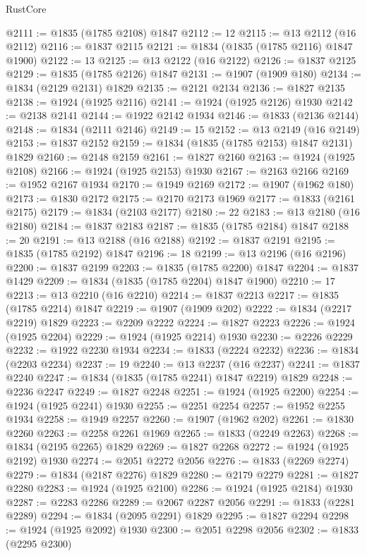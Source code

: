\begin{lexlean}{RustCore}
\begin{coremodule}
@2111 := @1835 (@1785 @2108) @1847
@2112 := 12
@2115 := @13 @2112 (@16 @2112)
@2116 := @1837 @2115
@2121 := @1834 (@1835 (@1785 @2116) @1847 @1900)
@2122 := 13
@2125 := @13 @2122 (@16 @2122)
@2126 := @1837 @2125
@2129 := @1835 (@1785 @2126) @1847
@2131 := @1907 (@1909 @180)
@2134 := @1834 (@2129 @2131) @1829
@2135 := @2121 @2134
@2136 := @1827 @2135
@2138 := @1924 (@1925 @2116)
@2141 := @1924 (@1925 @2126) @1930
@2142 := @2138 @2141
@2144 := @1922 @2142 @1934
@2146 := @1833 (@2136 @2144)
@2148 := @1834 (@2111 @2146)
@2149 := 15
@2152 := @13 @2149 (@16 @2149)
@2153 := @1837 @2152
@2159 := @1834 (@1835 (@1785 @2153) @1847 @2131) @1829
@2160 := @2148 @2159
@2161 := @1827 @2160
@2163 := @1924 (@1925 @2108)
@2166 := @1924 (@1925 @2153) @1930
@2167 := @2163 @2166
@2169 := @1952 @2167 @1934
@2170 := @1949 @2169
@2172 := @1907 (@1962 @180)
@2173 := @1830 @2172
@2175 := @2170 @2173 @1969
@2177 := @1833 (@2161 @2175)
@2179 := @1834 (@2103 @2177)
@2180 := 22
@2183 := @13 @2180 (@16 @2180)
@2184 := @1837 @2183
@2187 := @1835 (@1785 @2184) @1847
@2188 := 20
@2191 := @13 @2188 (@16 @2188)
@2192 := @1837 @2191
@2195 := @1835 (@1785 @2192) @1847
@2196 := 18
@2199 := @13 @2196 (@16 @2196)
@2200 := @1837 @2199
@2203 := @1835 (@1785 @2200) @1847
@2204 := @1837 @1429
@2209 := @1834 (@1835 (@1785 @2204) @1847 @1900)
@2210 := 17
@2213 := @13 @2210 (@16 @2210)
@2214 := @1837 @2213
@2217 := @1835 (@1785 @2214) @1847
@2219 := @1907 (@1909 @202)
@2222 := @1834 (@2217 @2219) @1829
@2223 := @2209 @2222
@2224 := @1827 @2223
@2226 := @1924 (@1925 @2204)
@2229 := @1924 (@1925 @2214) @1930
@2230 := @2226 @2229
@2232 := @1922 @2230 @1934
@2234 := @1833 (@2224 @2232)
@2236 := @1834 (@2203 @2234)
@2237 := 19
@2240 := @13 @2237 (@16 @2237)
@2241 := @1837 @2240
@2247 := @1834 (@1835 (@1785 @2241) @1847 @2219) @1829
@2248 := @2236 @2247
@2249 := @1827 @2248
@2251 := @1924 (@1925 @2200)
@2254 := @1924 (@1925 @2241) @1930
@2255 := @2251 @2254
@2257 := @1952 @2255 @1934
@2258 := @1949 @2257
@2260 := @1907 (@1962 @202)
@2261 := @1830 @2260
@2263 := @2258 @2261 @1969
@2265 := @1833 (@2249 @2263)
@2268 := @1834 (@2195 @2265) @1829
@2269 := @1827 @2268
@2272 := @1924 (@1925 @2192) @1930
@2274 := @2051 @2272 @2056
@2276 := @1833 (@2269 @2274)
@2279 := @1834 (@2187 @2276) @1829
@2280 := @2179 @2279
@2281 := @1827 @2280
@2283 := @1924 (@1925 @2100)
@2286 := @1924 (@1925 @2184) @1930
@2287 := @2283 @2286
@2289 := @2067 @2287 @2056
@2291 := @1833 (@2281 @2289)
@2294 := @1834 (@2095 @2291) @1829
@2295 := @1827 @2294
@2298 := @1924 (@1925 @2092) @1930
@2300 := @2051 @2298 @2056
@2302 := @1833 (@2295 @2300)

\end{coremodule}
\end{lexlean}
